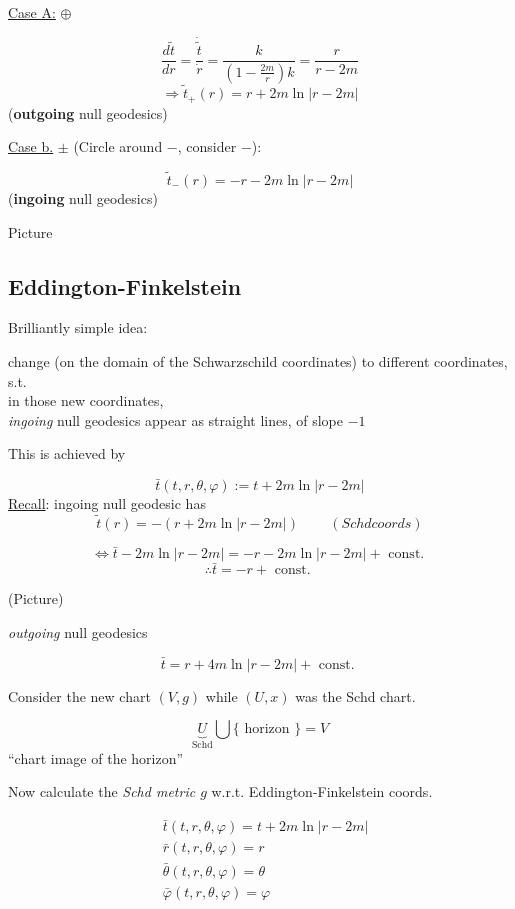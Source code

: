 \documentclass[10pt, twoside]{amsart}
\begin{document}
\begin{multicols*}{2}
\underline{Case A:} $\oplus$

\[
\frac{d\widetilde{t}}{dr} = \frac{ \dot{ \widetilde{t}} }{ \dot{r}} = \frac{k}{ \left( 1 - \frac{2m}{r} \right) k } = \frac{r}{r-2m}
\]
\[
\Longrightarrow \widetilde{t}_+(r) = r + 2m \ln{ |r-2m | }
\]
(\textbf{outgoing} null geodesics)

\underline{Case b.} $\pm$ (Circle around $-$, consider $-$):

\[
\widetilde{t}_-(r) = -r - 2m \ln{ |r - 2m | }
\]
(\textbf{ingoing} null geodesics)

Picture

\subsection{Eddington-Finkelstein}

Brilliantly simple idea: 

change (on the domain of the Schwarzschild coordinates) to different coordinates, s.t.  \\ 
in those new coordinates, \\
\emph{ingoing} null geodesics appear as straight lines, of slope $-1$ 

This is achieved by 

\[
\bar{t}(t,r,\theta, \varphi) := t + 2m \ln{ | r-2m | }
\]
\underline{Recall}: ingoing null geodesic has 
\[
\widetilde{t}(r) = -(r + 2m \ln{ |r-2m |} )  \quad \quad \, (Schd coords)
\]

\[
\Longleftrightarrow \bar{t} - 2m \ln{ |r-2m |} = -r - 2m \ln{ |r-2m |} + \text{ const. }
\]
\[
\therefore \bar{t} = -r + \text{ const. }
\]

(Picture)

\emph{outgoing} null geodesics

\[
\bar{t} = r + 4 m \ln{ |r - 2m| } + \text{ const. }
\]

Consider the new chart $(V,g)$ while $(U,x)$ was the Schd chart.

\[
\underbrace{U}_{\text{Schd}} \bigcup \lbrace \text{ horizon } \rbrace = V
\]
``chart image of the horizon''

Now calculate the \emph{Schd metric $g$ } w.r.t. Eddington-Finkelstein coords.

\[
\begin{aligned}
  & \bar{t}(t,r,\theta,\varphi) = t + 2m\ln{ |r -2m | } \\
  & \bar{r}(t,r,\theta,\varphi) = r \\
  & \bar{\theta}(t,r,\theta,\varphi) = \theta \\
  & \bar{\varphi}(t,r,\theta,\varphi) = \varphi
\end{aligned}
\]


\end{multicols*}
\end{document}
